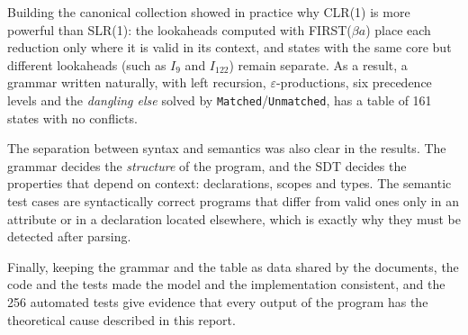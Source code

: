 \documentclass[11pt,letterpaper]{article}
\begin{document}
Building the canonical collection showed in practice why CLR(1) is more
powerful than SLR(1): the lookaheads computed with FIRST($\beta a$) place each
reduction only where it is valid in its context, and states with the same
core but different lookaheads (such as $I_9$ and $I_{122}$) remain separate.
As a result, a grammar written naturally, with left recursion,
$\varepsilon$-productions, six precedence levels and the \emph{dangling else}
solved by \texttt{Matched}/\texttt{Unmatched}, has a table of 161 states with
no conflicts.

The separation between syntax and semantics was also clear in the results.
The grammar decides the \emph{structure} of the program, and the SDT decides
the properties that depend on context: declarations, scopes and types. The
semantic test cases are syntactically correct programs that differ from
valid ones only in an attribute or in a declaration located elsewhere, which
is exactly why they must be detected after parsing.

Finally, keeping the grammar and the table as data shared by the documents,
the code and the tests made the model and the implementation consistent,
and the 256 automated tests give evidence that every output of the program
has the theoretical cause described in this report.
\end{document}
